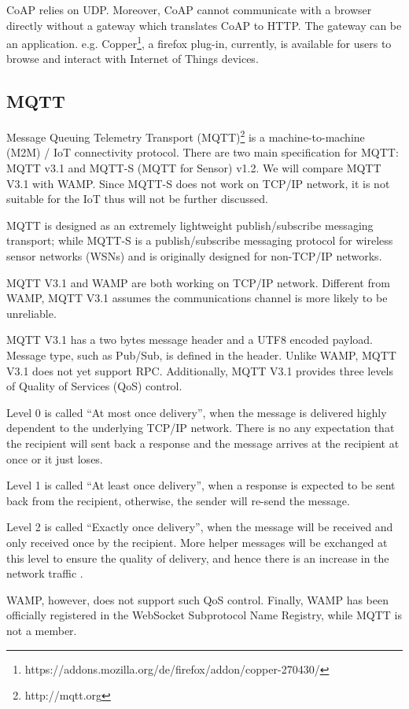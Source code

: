 CoAP relies on UDP. Moreover, CoAP cannot communicate with a browser directly without a gateway which translates CoAP to HTTP. The gateway can be an application. e.g. Copper\footnote{https://addons.mozilla.org/de/firefox/addon/copper-270430/}, a firefox plug-in, currently, is available for users to browse and interact with Internet of Things devices.

\subsection{MQTT}
Message Queuing Telemetry Transport (MQTT)\footnote{http://mqtt.org} is a machine-to-machine (M2M) / IoT connectivity protocol. There are two main specification for MQTT: MQTT v3.1 and MQTT-S (MQTT for Sensor) v1.2. We will compare MQTT V3.1 with WAMP. Since MQTT-S does not work on TCP/IP network, it is not suitable for the IoT thus will not be further discussed.

MQTT is designed as an extremely lightweight publish/subscribe messaging transport; while MQTT-S is a publish/subscribe messaging protocol for wireless sensor networks (WSNs) and is originally designed for non-TCP/IP networks.

MQTT V3.1 and WAMP are both working on TCP/IP network. Different from WAMP, MQTT V3.1 assumes the communications channel is more likely to be unreliable.

MQTT V3.1 has a two bytes message header and a UTF8 encoded payload.
Message type, such as Pub/Sub, is defined in the header. Unlike WAMP, MQTT V3.1 does not yet support RPC. Additionally, MQTT V3.1 provides three levels of Quality of Services (QoS) control.

Level 0 is called ``At most once delivery'', when the message is delivered highly dependent to the underlying TCP/IP network. There is no any expectation that the recipient will sent back a response and the message arrives at the recipient at once or it just loses.

Level 1 is called ``At least once delivery'', when a response is expected to be sent back from the recipient, otherwise, the sender will re-send the message.

Level 2 is called ``Exactly once delivery'', when the message will be received and only received once by the recipient. More helper messages will be exchanged at this level to ensure the quality of delivery, and hence there is an increase in the network traffic \cite{MQTTV31ProtocolSpec}.

WAMP, however, does not support such QoS control. Finally, WAMP has been officially registered in the WebSocket Subprotocol Name Registry, while MQTT is not a member.

